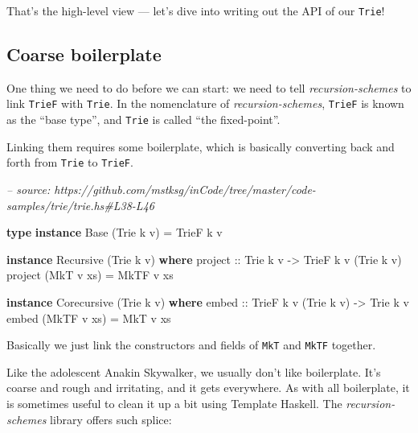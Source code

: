 \documentclass[]{article}
\newenvironment{Shaded}{}{}
\newcommand{\CommentTok}[1]{\textcolor[rgb]{0.38,0.63,0.69}{\textit{#1}}}
\newcommand{\DataTypeTok}[1]{\textcolor[rgb]{0.56,0.13,0.00}{#1}}
\newcommand{\FunctionTok}[1]{\textcolor[rgb]{0.02,0.16,0.49}{#1}}
\newcommand{\KeywordTok}[1]{\textcolor[rgb]{0.00,0.44,0.13}{\textbf{#1}}}
\newcommand{\NormalTok}[1]{#1}
\newcommand{\OtherTok}[1]{\textcolor[rgb]{0.00,0.44,0.13}{#1}}
\begin{document}
That's the high-level view --- let's dive into writing out the API of our
\texttt{Trie}!

\hypertarget{coarse-boilerplate}{%
\subsection{Coarse boilerplate}\label{coarse-boilerplate}}

One thing we need to do before we can start: we need to tell
\emph{recursion-schemes} to link \texttt{TrieF} with \texttt{Trie}. In the
nomenclature of \emph{recursion-schemes}, \texttt{TrieF} is known as the ``base
type'', and \texttt{Trie} is called ``the fixed-point''.

Linking them requires some boilerplate, which is basically converting back and
forth from \texttt{Trie} to \texttt{TrieF}.

\begin{Shaded}
\begin{Highlighting}[]
\CommentTok{-- source: https://github.com/mstksg/inCode/tree/master/code-samples/trie/trie.hs#L38-L46}

\KeywordTok{type} \KeywordTok{instance} \DataTypeTok{Base}\NormalTok{ (}\DataTypeTok{Trie}\NormalTok{ k v) }\FunctionTok{=} \DataTypeTok{TrieF}\NormalTok{ k v}

\KeywordTok{instance} \DataTypeTok{Recursive}\NormalTok{ (}\DataTypeTok{Trie}\NormalTok{ k v) }\KeywordTok{where}
\OtherTok{    project ::} \DataTypeTok{Trie}\NormalTok{ k v }\OtherTok{->} \DataTypeTok{TrieF}\NormalTok{ k v (}\DataTypeTok{Trie}\NormalTok{ k v)}
\NormalTok{    project (}\DataTypeTok{MkT}\NormalTok{ v xs) }\FunctionTok{=} \DataTypeTok{MkTF}\NormalTok{ v xs}

\KeywordTok{instance} \DataTypeTok{Corecursive}\NormalTok{ (}\DataTypeTok{Trie}\NormalTok{ k v) }\KeywordTok{where}
\OtherTok{    embed ::} \DataTypeTok{TrieF}\NormalTok{ k v (}\DataTypeTok{Trie}\NormalTok{ k v) }\OtherTok{->} \DataTypeTok{Trie}\NormalTok{ k v}
\NormalTok{    embed (}\DataTypeTok{MkTF}\NormalTok{ v xs) }\FunctionTok{=} \DataTypeTok{MkT}\NormalTok{ v xs}
\end{Highlighting}
\end{Shaded}

Basically we just link the constructors and fields of \texttt{MkT} and
\texttt{MkTF} together.

Like the adolescent Anakin Skywalker, we usually don't like boilerplate. It's
coarse and rough and irritating, and it gets everywhere. As with all
boilerplate, it is sometimes useful to clean it up a bit using Template Haskell.
The \emph{recursion-schemes} library offers such splice:
\end{document}
